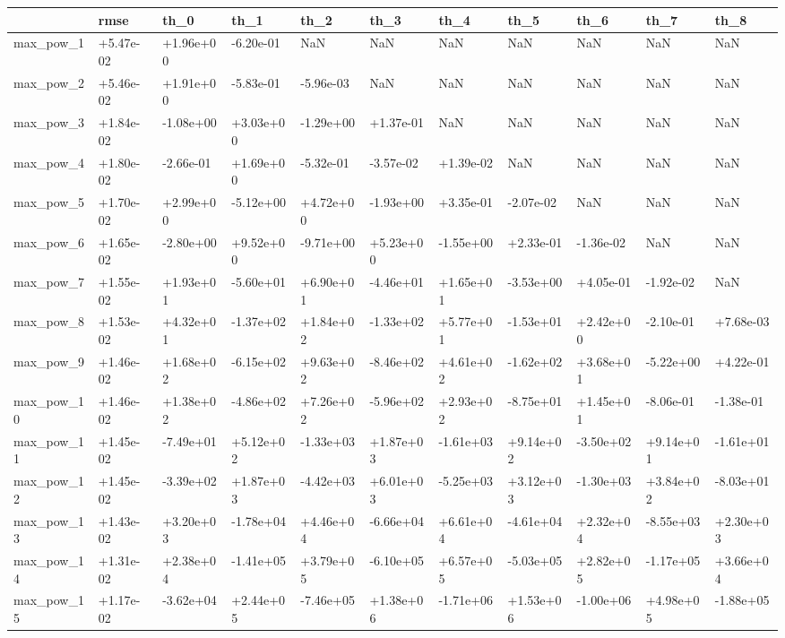 \begin{tabular}{lllllllllll}
\toprule
{} &      rmse &      th\_0 &      th\_1 &      th\_2 &      th\_3 &      th\_4 &      th\_5 &      th\_6 &      th\_7 &      th\_8 \\
\midrule
max\_pow\_1  & +5.47e-02 & +1.96e+00 & -6.20e-01 &       NaN &       NaN &       NaN &       NaN &       NaN &       NaN &       NaN \\
max\_pow\_2  & +5.46e-02 & +1.91e+00 & -5.83e-01 & -5.96e-03 &       NaN &       NaN &       NaN &       NaN &       NaN &       NaN \\
max\_pow\_3  & +1.84e-02 & -1.08e+00 & +3.03e+00 & -1.29e+00 & +1.37e-01 &       NaN &       NaN &       NaN &       NaN &       NaN \\
max\_pow\_4  & +1.80e-02 & -2.66e-01 & +1.69e+00 & -5.32e-01 & -3.57e-02 & +1.39e-02 &       NaN &       NaN &       NaN &       NaN \\
max\_pow\_5  & +1.70e-02 & +2.99e+00 & -5.12e+00 & +4.72e+00 & -1.93e+00 & +3.35e-01 & -2.07e-02 &       NaN &       NaN &       NaN \\
max\_pow\_6  & +1.65e-02 & -2.80e+00 & +9.52e+00 & -9.71e+00 & +5.23e+00 & -1.55e+00 & +2.33e-01 & -1.36e-02 &       NaN &       NaN \\
max\_pow\_7  & +1.55e-02 & +1.93e+01 & -5.60e+01 & +6.90e+01 & -4.46e+01 & +1.65e+01 & -3.53e+00 & +4.05e-01 & -1.92e-02 &       NaN \\
max\_pow\_8  & +1.53e-02 & +4.32e+01 & -1.37e+02 & +1.84e+02 & -1.33e+02 & +5.77e+01 & -1.53e+01 & +2.42e+00 & -2.10e-01 & +7.68e-03 \\
max\_pow\_9  & +1.46e-02 & +1.68e+02 & -6.15e+02 & +9.63e+02 & -8.46e+02 & +4.61e+02 & -1.62e+02 & +3.68e+01 & -5.22e+00 & +4.22e-01 \\
max\_pow\_10 & +1.46e-02 & +1.38e+02 & -4.86e+02 & +7.26e+02 & -5.96e+02 & +2.93e+02 & -8.75e+01 & +1.45e+01 & -8.06e-01 & -1.38e-01 \\
max\_pow\_11 & +1.45e-02 & -7.49e+01 & +5.12e+02 & -1.33e+03 & +1.87e+03 & -1.61e+03 & +9.14e+02 & -3.50e+02 & +9.14e+01 & -1.61e+01 \\
max\_pow\_12 & +1.45e-02 & -3.39e+02 & +1.87e+03 & -4.42e+03 & +6.01e+03 & -5.25e+03 & +3.12e+03 & -1.30e+03 & +3.84e+02 & -8.03e+01 \\
max\_pow\_13 & +1.43e-02 & +3.20e+03 & -1.78e+04 & +4.46e+04 & -6.66e+04 & +6.61e+04 & -4.61e+04 & +2.32e+04 & -8.55e+03 & +2.30e+03 \\
max\_pow\_14 & +1.31e-02 & +2.38e+04 & -1.41e+05 & +3.79e+05 & -6.10e+05 & +6.57e+05 & -5.03e+05 & +2.82e+05 & -1.17e+05 & +3.66e+04 \\
max\_pow\_15 & +1.17e-02 & -3.62e+04 & +2.44e+05 & -7.46e+05 & +1.38e+06 & -1.71e+06 & +1.53e+06 & -1.00e+06 & +4.98e+05 & -1.88e+05 \\
\bottomrule
\end{tabular}
